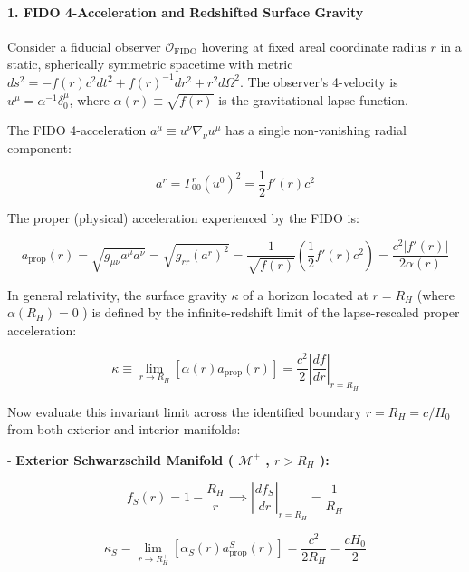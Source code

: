 \documentclass[11pt,a4paper]{article}
\theoremstyle{definition}\newtheorem{definition}{Definition}
\theoremstyle{remark}\newtheorem{remark}{Remark}
\begin{document}
\paragraph{1. FIDO 4-Acceleration and Redshifted Surface Gravity}

Consider a fiducial observer $\mathcal{O}_{\text{FIDO}}$ hovering at fixed areal coordinate radius $r$ in a static, spherically symmetric spacetime with metric $ds^2 = -f(r) c^2 dt^2 + f(r)^{-1} dr^2 + r^2 d\Omega^2$. The observer's 4-velocity is $u^\mu = \alpha^{-1} \delta^\mu_0$, where $\alpha(r) \equiv \sqrt{f(r)}$ is the gravitational lapse function.

The FIDO 4-acceleration $a^\mu \equiv u^\nu \nabla_\nu u^\mu$ has a single non-vanishing radial component:


\begin{equation}
a^r = \Gamma^r_{00} (u^0)^2 = \frac{1}{2} f'(r) c^2
\end{equation}


The proper (physical) acceleration experienced by the FIDO is:


\begin{equation}
a_{\text{prop}}(r) = \sqrt{g_{\mu\nu} a^\mu a^\nu} = \sqrt{g_{rr} (a^r)^2} = \frac{1}{\sqrt{f(r)}} \left(\frac{1}{2} f'(r) c^2\right) = \frac{c^2 |f'(r)|}{2 \alpha(r)}
\end{equation}


In general relativity, the surface gravity $\kappa$ of a horizon located at $r = R_H$ (where $\alpha(R_H) = 0$ ) is defined by the infinite-redshift limit of the lapse-rescaled proper acceleration:


\begin{equation}
\kappa \equiv \lim_{r \to R_H} \left[ \alpha(r) a_{\text{prop}}(r) \right] = \frac{c^2}{2} \left| \frac{df}{dr} \right|_{r = R_H}
\end{equation}


Now evaluate this invariant limit across the identified boundary $r = R_H = c/H_0$ from both exterior and interior manifolds:

- \textbf{Exterior Schwarzschild Manifold ( $\mathcal{M}^+$ , $r > R_H$ ):}


\begin{equation}
f_S(r) = 1 - \frac{R_H}{r} \implies \left| \frac{df_S}{dr} \right|_{r = R_H} = \frac{1}{R_H}
\end{equation}



\begin{equation}
\kappa_S = \lim_{r \to R_H^+} \left[ \alpha_S(r) a_{\text{prop}}^S(r) \right] = \frac{c^2}{2 R_H} = \frac{c H_0}{2}
\end{equation}
\end{document}
